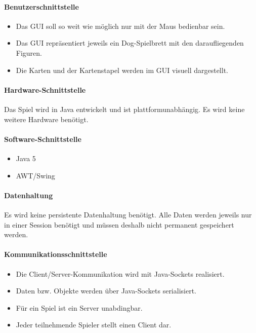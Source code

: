 \documentclass[12pt,halfparskip]{scrartcl}
\begin{document}
\paragraph{Benutzerschnittstelle}\label{ssub:benutzerschnittstelle} %
\begin{itemize}
	\item Das GUI soll so weit wie möglich nur mit der Maus bedienbar sein.
	\item Das GUI repräsentiert jeweils ein Dog-Spielbrett mit den daraufliegenden Figuren.
	\item Die Karten und der Kartenstapel werden im GUI visuell dargestellt.
\end{itemize}
\paragraph{Hardware-Schnittstelle}\label{ssub:hardware_schnittstelle} %
Das Spiel wird in Java entwickelt und ist plattformunabhängig. Es wird keine weitere Hardware benötigt.
\paragraph{Software-Schnittstelle}\label{ssub:software_schnittstelle} %
\begin{itemize}
	\item Java 5
	\item AWT/Swing
\end{itemize}
\paragraph{Datenhaltung}\label{ssub:datenhaltung} %
Es wird keine persistente Datenhaltung benötigt. Alle Daten werden jeweils nur in einer Session benötigt und müssen deshalb nicht permanent gespeichert werden.
\paragraph{Kommunikationsschnittstelle}\label{ssub:kommunikationsschnittstelle} %
\begin{itemize}
	\item Die Client/Server-Kommunikation wird mit Java-Sockets realisiert.
	\item Daten bzw. Objekte werden über Java-Sockets serialisiert.
	\item Für ein Spiel ist ein Server unabdingbar.
	\item Jeder teilnehmende Spieler stellt einen Client dar.
\end{itemize}
\end{document}
